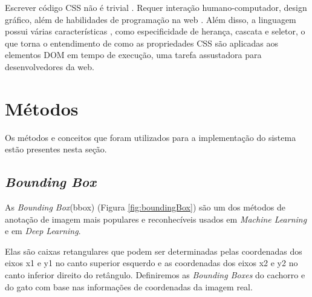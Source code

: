 Escrever código CSS não é trivial \cite{quint2007editing}. Requer interação humano-computador, design gráfico, além de habilidades de programação na web \cite{keller2010css}. Além disso, a linguagem possui várias características , como especificidade de herança, cascata e seletor, o que torna o entendimento de como as propriedades CSS são aplicadas aos elementos DOM em tempo de execução, uma tarefa assustadora para desenvolvedores da web.


\section{Métodos}
Os métodos e conceitos que foram utilizados para a implementação do sistema estão presentes nesta seção.

\subsection{\textit{Bounding Box}}

As \textit{Bounding Box}(bbox) (Figura \ref{fig:boundingBox}) são um dos métodos de anotação de imagem mais populares e reconhecíveis usados em \textit{Machine Learning} e em \textit{Deep Learning}.

Elas são caixas retangulares que podem ser determinadas pelas coordenadas dos eixos x1 e y1 no canto superior esquerdo e as coordenadas dos eixos x2 e y2 no canto inferior direito do retângulo. Definiremos as \textit{Bounding Boxes} do cachorro e do gato com base nas informações de coordenadas da imagem real.\cite{allDeep}


